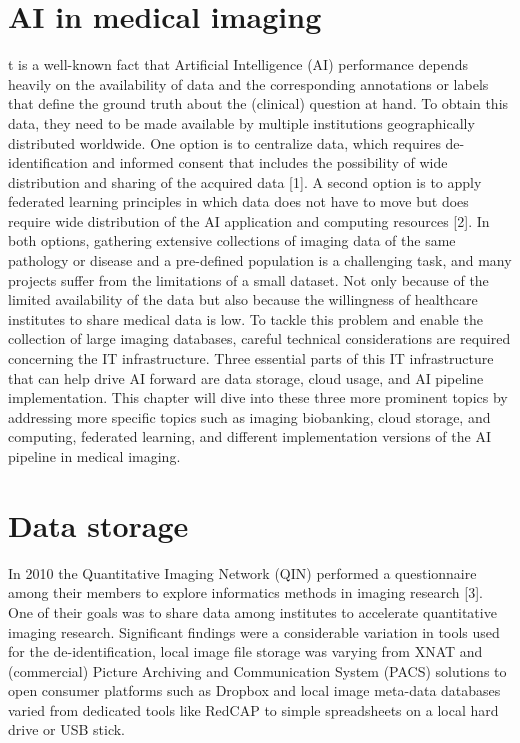 \section{AI in medical imaging}
t is a well-known fact that Artificial Intelligence (AI) performance depends heavily on the availability of data and the corresponding annotations or labels that define the ground truth about the (clinical) question at hand. To obtain this data, they need to be made available by multiple institutions geographically distributed worldwide. One option is to centralize data, which requires de-identification and informed consent that includes the possibility of wide distribution and sharing of the acquired data [1]. A second option is to apply federated learning principles in which data does not have to move but does require wide distribution of the AI application and computing resources [2]. In both options, gathering extensive collections of imaging data of the same pathology or disease and a pre-defined population is a challenging task, and many projects suffer from the limitations of a small dataset. Not only because of the limited availability of the data but also because the willingness of healthcare institutes to share medical data is low. 
To tackle this problem and enable the collection of large imaging databases, careful technical considerations are required concerning the IT infrastructure. Three essential parts of this IT infrastructure that can help drive AI forward are data storage, cloud usage, and AI pipeline implementation. This chapter will dive into these three more prominent topics by addressing more specific topics such as imaging biobanking, cloud storage, and computing, federated learning, and different implementation versions of the AI pipeline in medical imaging.


\section{Data storage}

In 2010 the Quantitative Imaging Network (QIN) performed a questionnaire among their members to explore informatics methods in imaging research [3]. One of their goals was to share data among institutes to accelerate quantitative imaging research. Significant findings were a considerable variation in tools used for the de-identification, local image file storage was varying from XNAT and (commercial) Picture Archiving and Communication System (PACS) solutions to open consumer platforms such as Dropbox and local image meta-data databases varied from dedicated tools like RedCAP to simple spreadsheets on a local hard drive or USB stick.







